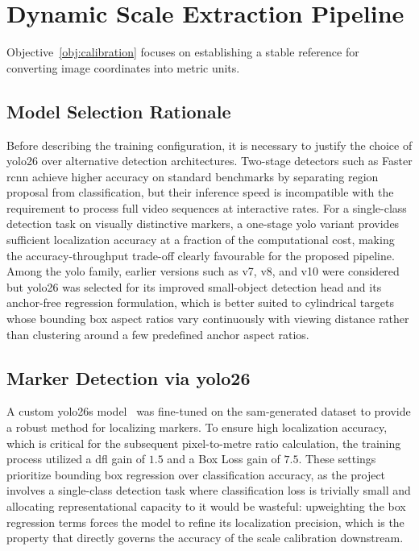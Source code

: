 \section{Dynamic Scale Extraction Pipeline}\label{sec:scale-extraction}

Objective~\ref{obj:calibration} focuses on establishing a stable reference for converting image coordinates into
metric units.

\subsection{Model Selection Rationale}

Before describing the training configuration, it is necessary to justify the choice of \gls{yolo26}
over alternative detection architectures. Two-stage detectors such as Faster \gls{rcnn} achieve
higher accuracy on standard benchmarks by separating region proposal from classification, but
their inference speed is incompatible with the requirement to process full video sequences at
interactive rates. For a single-class detection task on visually distinctive markers, a
one-stage \gls{yolo} variant provides sufficient localization accuracy at a fraction of the
computational cost, making the accuracy-throughput trade-off clearly favourable for the
proposed pipeline. Among the \gls{yolo} family, earlier versions such as v7, v8, and v10 were
considered but \gls{yolo26} was selected for its improved small-object detection head and its
anchor-free regression formulation, which is better suited to cylindrical targets whose
bounding box aspect ratios vary continuously with viewing distance rather than clustering
around a few predefined anchor aspect ratios.

\subsection{Marker Detection via \gls{yolo26}}

A custom \gls{yolo26}s model~\cite{jocher_ultralytics_2023} was fine-tuned on the \gls{sam}-generated
dataset to provide a robust method for localizing markers. To ensure high localization
accuracy, which is critical for the subsequent pixel-to-metre ratio calculation, the training
process utilized a \gls{dfl} gain of $1.5$ and a Box Loss gain of $7.5$.
These settings prioritize bounding box regression over classification accuracy, as the project
involves a single-class detection task where classification loss is trivially small and
allocating representational capacity to it would be wasteful: upweighting the box regression
terms forces the model to refine its localization precision, which is the property that
directly governs the accuracy of the scale calibration downstream.

